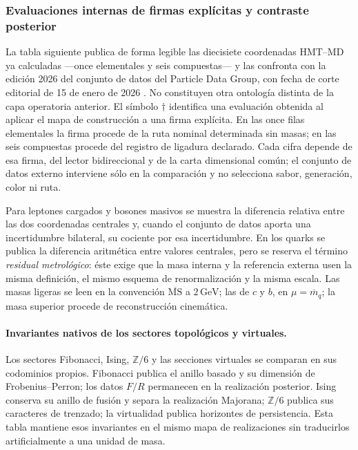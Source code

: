 
\subsubsection{Evaluaciones internas de firmas explícitas y contraste posterior}

La tabla siguiente publica de forma legible las diecisiete coordenadas HMT--MD ya
calculadas ---once elementales y seis compuestas--- y las confronta con la
edición 2026 del conjunto de datos del Particle Data Group, con fecha de corte
editorial de 15 de enero de 2026 \cite{PDG2026}. No constituyen otra ontología
distinta de la capa operatoria anterior. El símbolo \(\dagger\)
identifica una evaluación obtenida al aplicar el mapa de construcción a una firma
explícita. En las once filas elementales la firma procede de la ruta nominal
determinada sin masas; en las seis compuestas procede del registro de ligadura
declarado. Cada cifra depende de esa firma, del lector bidireccional y de la carta
dimensional común; el conjunto de datos externo interviene sólo en la comparación
y no selecciona sabor, generación, color ni ruta.


Para leptones cargados y bosones masivos se muestra la diferencia relativa entre
las dos coordenadas centrales y, cuando el conjunto de datos aporta una incertidumbre
bilateral, su cociente por esa incertidumbre. En los quarks se publica la
diferencia aritmética entre valores centrales, pero se reserva el término
\emph{residual metrológico}: éste exige que la masa interna y la referencia externa
usen la misma definición, el mismo esquema de renormalización y la misma escala.
Las masas ligeras se leen en la convención \(\overline{\mathrm{MS}}\) a
\(2\,\mathrm{GeV}\); las de \(c\) y \(b\), en
\(\mu=\overline m_q\); la masa superior procede de reconstrucción cinemática.



\paragraph{Invariantes nativos de los sectores topológicos y virtuales.}
Los sectores Fibonacci, Ising, \(\mathbb Z/6\) y las secciones virtuales se comparan
en sus codominios propios. Fibonacci publica el anillo basado y su dimensión de
Frobenius--Perron; los datos \(F/R\) permanecen en la realización posterior. Ising
conserva su anillo de fusión y separa la realización Majorana; \(\mathbb Z/6\)
publica sus caracteres de trenzado; la virtualidad publica horizontes de
persistencia. Esta
tabla mantiene esos invariantes en el mismo mapa de realizaciones sin traducirlos
artificialmente a una unidad de masa.

